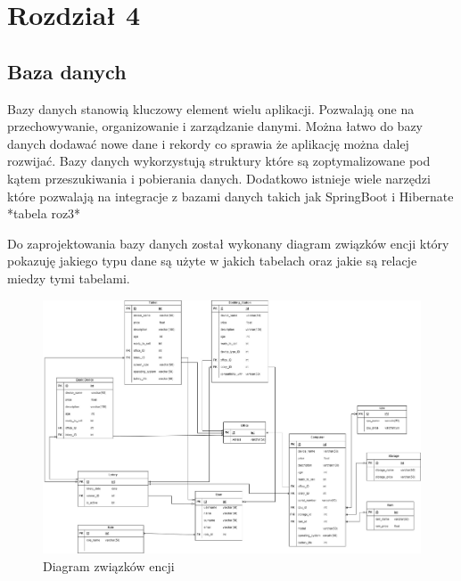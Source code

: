 \chapter{Rozdział 4}
\section{Baza danych}

Bazy danych stanowią kluczowy element wielu aplikacji. Pozwalają one na przechowywanie, organizowanie i zarządzanie danymi. Można łatwo do bazy danych dodawać nowe dane i rekordy co sprawia że aplikację można dalej rozwijać. Bazy danych wykorzystują struktury które są zoptymalizowane pod kątem przeszukiwania i pobierania danych. Dodatkowo istnieje wiele narzędzi które pozwalają na integracje z bazami danych takich jak SpringBoot i Hibernate *tabela roz3*

Do zaprojektowania bazy danych został wykonany diagram związków encji który pokazuję jakiego typu dane są użyte w jakich tabelach oraz jakie są relacje miedzy tymi tabelami.

\begin{figure}[h]
    \includegraphics[scale=0.3]{rys04/ER_Diagram.jpg}
    \caption{Diagram związków encji}
    \label{ErDiagram_etykieta}
\end{figure}

